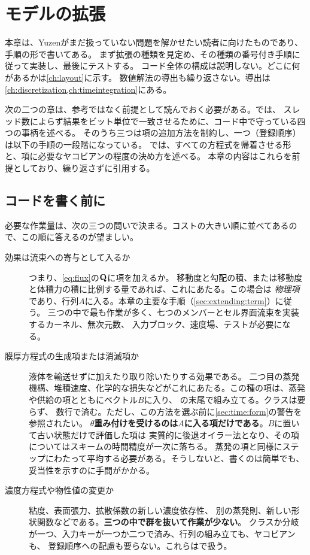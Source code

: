 \chapter{モデルの拡張}
\label{ch:extending}

本章は、Yuzenがまだ扱っていない問題を解かせたい読者に向けたものであり、手順の形で書いてある。
まず拡張の種類を見定め、その種類の番号付き手順に従って実装し、最後にテストする。
コード全体の構成は説明しない。どこに何があるかは\cref{ch:layout}に示す。
数値解法の導出も繰り返さない。導出は\cref{ch:discretization,ch:timeintegration}にある。

次の二つの章は、参考ではなく前提として読んでおく必要がある。では、
スレッド数によらず結果をビット単位で一致させるために、コード中で守っている四つの事柄を述べる。
そのうち三つは項の追加方法を制約し、一つ（登録順序）は以下の手順の一段階になっている。
では、すべての方程式を帰着させる形と、項に必要なヤコビアンの程度の決め方を述べる。
本章の内容はこれらを前提としており、繰り返さずに引用する。

\section{コードを書く前に}
\label{sec:extending:decide}

必要な作業量は、次の三つの問いで決まる。コストの大きい順に並べてあるので、この順に答えるのが望ましい。

\begin{description}
  \item[効果は流束への寄与として入るか] つまり、\cref{eq:flux}の$\mathbf{Q}$に項を加えるか。
    移動度と勾配の積、または移動度と体積力の積に比例する量であれば、これにあたる。この場合は
    \emph{物理項}であり、行列$A$に入る。本章の主要な手順（\cref{sec:extending:term}）に従う。
    三つの中で最も作業が多く、七つのメンバーとセル界面流束を実装するカーネル、無次元数、
    入力ブロック、速度場、テストが必要になる。
  \item[膜厚方程式の生成項または消滅項か] 液体を輸送せずに加えたり取り除いたりする効果である。
    二つ目の蒸発機構、堆積速度、化学的な損失などがこれにあたる。この種の項は、蒸発や供給の項とともにベクトル$B$に入り、
    の末尾で組み立てる。クラスは要らず、
    数行で済む。ただし、この方法を選ぶ前に\cref{sec:time:form}の警告を参照されたい。
    \textbf{$\theta$重み付けを受けるのは$A$に入る項だけである}。$B$に置いて古い状態だけで評価した項は
    実質的に後退オイラー法となり、その項についてはスキームの時間精度が一次に落ちる。
    蒸発の項と同様にステップにわたって平均する必要がある。そうしないと、書くのは簡単でも、
    妥当性を示すのに手間がかかる。
  \item[濃度方程式や物性値の変更か] 粘度、表面張力、拡散係数の新しい濃度依存性、
    別の蒸発則、新しい形状関数などである。\textbf{三つの中で群を抜いて作業が少ない}。
    クラスか分岐が一つ、入力キーが一つか二つで済み、行列の組み立ても、ヤコビアンも、
    登録順序への配慮も要らない。これらはで扱う。
\end{description}

